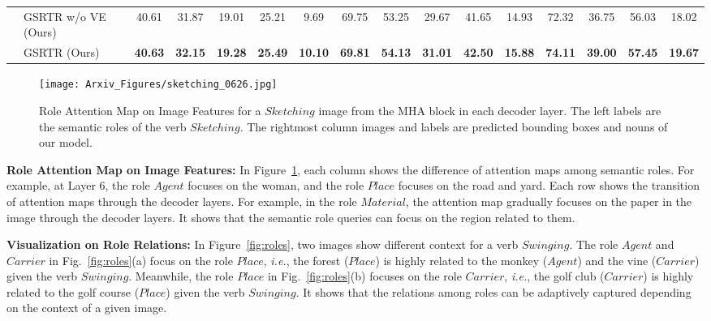 \begin{table}[!t]
{\begin{tabular}{l|l|ccccc|ccccc|cccc}
        \\    
        \cline{2-16}
            & GSRTR w/o VE (Ours)
            & 40.61 & 31.87 & 19.01 & 25.21 & 9.69
            & 69.75 & 53.25 & 29.67 & 41.65 & 14.93
            & 72.32 & 36.75 & 56.03 & 18.02        
        \\
            & GSRTR (Ours)
            & \textbf{40.63} & \textbf{32.15} & \textbf{19.28} & \textbf{25.49} & \textbf{10.10}       
            & \textbf{69.81} & \textbf{54.13} & \textbf{31.01} & \textbf{42.50} & \textbf{15.88}
            & \textbf{74.11} & \textbf{39.00} & \textbf{57.45} & \textbf{19.67}      
        \\
        \hline
    \end{tabular}}
\end{table}

\begin{figure}[!t]
    \centering
        \texttt{[image: Arxiv\_Figures/sketching\_0626.jpg]}
\caption{
    Role Attention Map on Image Features for a $Sketching$ image from the MHA block in each decoder layer.
    The left labels are the semantic roles of the verb $Sketching$.
    The rightmost column images and labels are predicted bounding boxes and nouns of our model.
}
\label{fig:role_img}
\end{figure}

\noindent
\textbf{Role Attention Map on Image Features:}
In Figure~\ref{fig:role_img}, each column shows the difference of attention maps among semantic roles.
For example, at Layer 6, the role $Agent$ focuses on the woman, and the role $Place$ focuses on the road and yard.
Each row shows the transition of attention maps through the decoder layers.
For example, in the role $Material$, the attention map gradually focuses on the paper in the image through the decoder layers.
It shows that the semantic role queries can focus on the region related to them.

\noindent
\textbf{Visualization on Role Relations:}
In Figure~\ref{fig:roles}, two images show different context for a verb $Swinging$.
The role $Agent$ and $Carrier$ in Fig.~\ref{fig:roles}(a) focus on the role $Place$, \emph{i.e.}, the forest ($Place$) is highly related to the monkey ($Agent$) and the vine ($Carrier$) given the verb $Swinging$.
Meanwhile, the role $Place$ in Fig.~\ref{fig:roles}(b) focuses on the role $Carrier$, \emph{i.e.}, the golf club ($Carrier$) is highly related to the golf course ($Place$) given the verb $Swinging$.
It shows that the relations among roles can be adaptively captured depending on the context of a given image.

